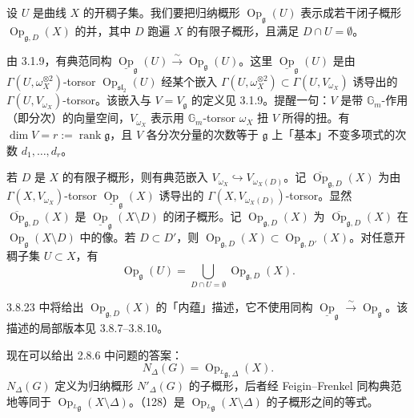 
 设 $U$ 是曲线 $X$ 的开稠子集。我们要把归纳概形 $\operatorname{Op}_{\mathfrak{g}}(U)$ 表示成若干闭子概形 $\operatorname{Op}_{\mathfrak{g},D}(X)$ 的并，其中 $D$ 跑遍 $X$ 的有限子概形，且满足 $D\cap U=\emptyset$。

由 3.1.9，有典范同构 $\underline{\operatorname{Op}}_{\mathfrak{g}}(U)\xrightarrow{\sim}\operatorname{Op}_{\mathfrak{g}}(U)$。这里 $\underline{\operatorname{Op}}_{\mathfrak{g}}(U)$ 是由 $\Gamma(U,\omega_{X}^{\otimes 2})$-torsor $\operatorname{Op}_{\mathfrak{sl}_{2}}(U)$ 经某个嵌入 $\Gamma(U,\omega_{X}^{\otimes 2})\subset\Gamma(U,V_{\omega_{X}})$ 诱导出的 $\Gamma(U,V_{\omega_{X}})$-torsor。该嵌入与 $V=V_{\mathfrak{g}}$ 的定义见 3.1.9。提醒一句：$V$ 是带 $\mathbb{G}_{m}$-作用（即分次）的向量空间，$V_{\omega_{X}}$ 表示用 $\mathbb{G}_{m}$-torsor $\omega_{X}$ 扭 $V$ 所得的扭。有 $\dim V=r:=\operatorname{rank}\mathfrak{g}$，且 $V$ 各分次分量的次数等于 $\mathfrak{g}$ 上「基本」不变多项式的次数 $d_{1},\ldots,d_{r}$。


若 $D$ 是 $X$ 的有限子概形，则有典范嵌入 $V_{\omega_{X}}\hookrightarrow V_{\omega_{X}(D)}$。记 $\overline{\operatorname{Op}}_{\mathfrak{g},D}(X)$ 为由 $\Gamma(X,V_{\omega_{X}})$-torsor $\underline{\operatorname{Op}}_{\mathfrak{g}}(X)$ 诱导出的 $\Gamma(X,V_{\omega_{X}(D)})$-torsor。显然 $\overline{\operatorname{Op}}_{\mathfrak{g},D}(X)$ 是 $\underline{\operatorname{Op}}_{\mathfrak{g}}(X\setminus D)$ 的闭子概形。记 $\operatorname{Op}_{\mathfrak{g},D}(X)$ 为 $\overline{\operatorname{Op}}_{\mathfrak{g},D}(X)$ 在 $\operatorname{Op}_{\mathfrak{g}}(X\setminus D)$ 中的像。若 $D\subset D'$，则 $\operatorname{Op}_{\mathfrak{g},D}(X)\subset\operatorname{Op}_{\mathfrak{g},D'}(X)$。对任意开稠子集 $U\subset X$，有
\[
\operatorname{Op}_{\mathfrak{g}}(U)=\bigcup_{D\cap U=\emptyset}\operatorname{Op}_{\mathfrak{g},D}(X).
\]

3.8.23 中将给出 $\operatorname{Op}_{\mathfrak{g},D}(X)$ 的「内蕴」描述，它不使用同构 $\underline{\operatorname{Op}}_{\mathfrak{g}}\xrightarrow{\sim}\operatorname{Op}_{\mathfrak{g}}$。该描述的局部版本见 3.8.7--3.8.10。

 现在可以给出 2.8.6 中问题的答案：
\begin{equation}\tag{128}
  N_{\Delta}(G)=\operatorname{Op}_{{}^{L}\mathfrak{g},\Delta}(X).
\end{equation}
$N_{\Delta}(G)$ 定义为归纳概形 $N'_{\Delta}(G)$ 的子概形，后者经 Feigin--Frenkel 同构典范地等同于 $\operatorname{Op}_{{}^{L}\mathfrak{g}}(X\setminus\Delta)$。（128）是 $\operatorname{Op}_{{}^{L}\mathfrak{g}}(X\setminus\Delta)$ 的子概形之间的等式。

